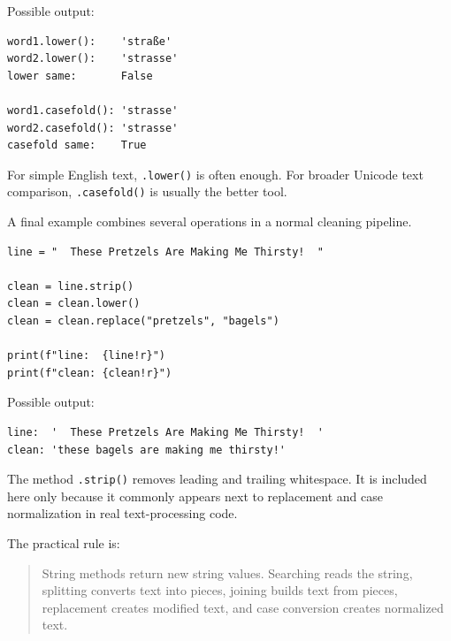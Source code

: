 Possible output:

\begin{verbatim}
word1.lower():    'straße'
word2.lower():    'strasse'
lower same:       False

word1.casefold(): 'strasse'
word2.casefold(): 'strasse'
casefold same:    True
\end{verbatim}

For simple English text, \texttt{.lower()} is often enough. For broader Unicode text comparison, \texttt{.casefold()} is usually the better tool.

A final example combines several operations in a normal cleaning pipeline.

\begin{verbatim}
line = "  These Pretzels Are Making Me Thirsty!  "

clean = line.strip()
clean = clean.lower()
clean = clean.replace("pretzels", "bagels")

print(f"line:  {line!r}")
print(f"clean: {clean!r}")
\end{verbatim}

Possible output:

\begin{verbatim}
line:  '  These Pretzels Are Making Me Thirsty!  '
clean: 'these bagels are making me thirsty!'
\end{verbatim}

The method \texttt{.strip()} removes leading and trailing whitespace. It is included here only because it commonly appears next to replacement and case normalization in real text-processing code.

The practical rule is:

\begin{quote}
String methods return new string values. Searching reads the string, splitting converts text into pieces, joining builds text from pieces, replacement creates modified text, and case conversion creates normalized text.
\end{quote}